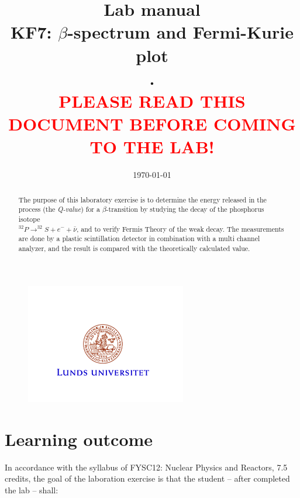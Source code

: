 \documentclass[a4,11pt, notitlepage]{article}
\begin{document}
 
\title{\huge{Lab manual
\\KF7: $\beta$-spectrum and Fermi-Kurie plot
\\.
\\\textcolor{red}{PLEASE READ THIS DOCUMENT BEFORE COMING TO THE LAB!}}}
\date{\today}
\maketitle

\vspace{10pt}
\begin{abstract}
The purpose of this laboratory exercise is to determine the energy released in the process (the \textit{Q-value}) for a $\beta$-transition by studying the decay of the phosphorus isotope 
\\$^{32}P\rightarrow ^{32}S + e^- + \bar{\nu}$, and to verify Fermis Theory of the weak decay. The measurements are done by a plastic scintillation detector in combination with a multi channel analyzer, and the result is compared with the theoretically calculated value. 
\end{abstract}

\begin{figure}[htp]
  \vspace{40pt}
  \begin{center}
    \includegraphics[width=7.0cm]{figures/LU.png}
  \end{center}
\end{figure}

\thispagestyle{empty}

\pagebreak
\tableofcontents 
\pagebreak
\section{Learning outcome}

In accordance with the syllabus of FYSC12: Nuclear Physics and Reactors, 7.5
credits, the goal of the laboration exercise is that the student -- after
completed the lab -- shall:
\end{document}
